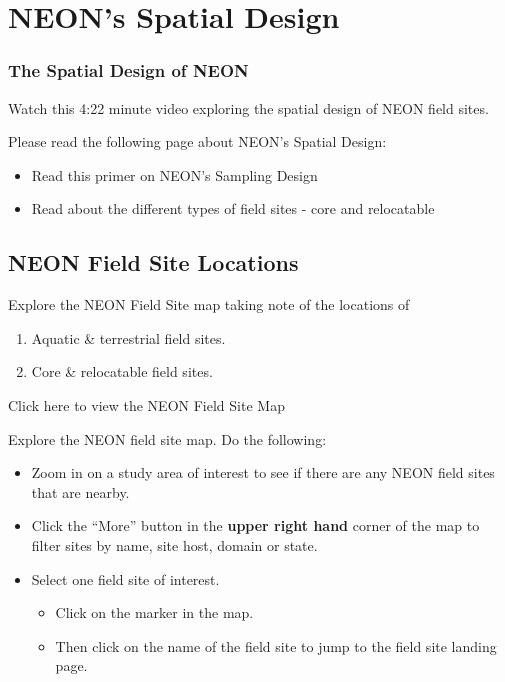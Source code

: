 \documentclass[]{book}
\providecommand{\tightlist}{%
  \setlength{\itemsep}{0pt}\setlength{\parskip}{0pt}}
\begin{document}
\hypertarget{neons-spatial-design}{%
\section{NEON's Spatial Design}\label{neons-spatial-design}}

\hypertarget{the-spatial-design-of-neon}{%
\subsubsection{The Spatial Design of NEON}\label{the-spatial-design-of-neon}}

Watch this 4:22 minute video exploring the spatial design of NEON field sites.

Please read the following page about NEON's Spatial Design:

\begin{itemize}
\item
  Read this primer on NEON's Sampling Design
\item
  Read about the different types of field sites - core and relocatable
\end{itemize}

\hypertarget{neon-field-site-locations}{%
\subsection{NEON Field Site Locations}\label{neon-field-site-locations}}

Explore the NEON Field Site map taking note of the locations of

\begin{enumerate}
\def\labelenumi{\arabic{enumi}.}
\tightlist
\item
  Aquatic \& terrestrial field sites.
\item
  Core \& relocatable field sites.
\end{enumerate}

Click here to view the NEON Field Site Map

Explore the NEON field site map. Do the following:

\begin{itemize}
\tightlist
\item
  Zoom in on a study area of interest to see if there are any NEON field sites
  that are nearby.
\item
  Click the ``More'' button in the \textbf{upper right hand} corner of the map to
  filter sites by name, site host, domain or state.
\item
  Select one field site of interest.

  \begin{itemize}
  \tightlist
  \item
    Click on the marker in the map.
  \item
    Then click on the name of the field site to jump to the field site landing page.
  \end{itemize}
\end{itemize}
\end{document}
